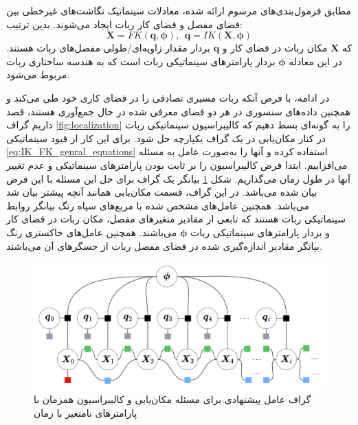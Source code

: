 مطابق فرمول‌بندی‌های مرسوم ارائه شده، معادلات سینماتیک نگاشت‌های غیرخطی بین فضای مفصل و فضای کار ربات ایجاد می‌شوند. بدین ترتیب:
\begin{equation} \label{eq:IK_FK_genral_equations}
	\boldsymbol{X} = FK(\boldsymbol{q}, \boldsymbol{\phi}), ~~ \boldsymbol{q} = IK(\boldsymbol{X}, \boldsymbol{\phi})
\end{equation}
که
$\boldsymbol{X}$
مکان ربات در فضای کار و
$\boldsymbol{q}$
بردار مقدار زاویه‌ای/طولی مفصل‌های ربات هستند. در این معادله
$\boldsymbol{\phi}$
بردار پارامترهای سینماتیکی ربات است که به هندسه ساختاری ربات مربوط می‌شود.

در ادامه، با فرض آنکه ربات مسیری تصادفی را در فضای کاری خود طی می‌کند و همچنین داده‌های سنسوری در هر دو فضای معرفی شده در حال جمع‌آوری هستند، قصد داریم گراف
\ref{fig:localization}
را به گونه‌ای بسط دهیم که کالیبراسیون سینماتیکی ربات در کنار مکان‌یابی در یک گراف یکپارچه حل شود. برای این کار از قیود سینماتیکی
\ref{eq:IK_FK_genral_equations}
استفاده کرده و آنها را به‌صورت عامل به مسئله می‌افزاییم. ابتدا فرض کالیبراسیون را بر ثابت بودن پارامترهای سینماتیکی و عدم تغییر آنها در طول زمان می‌گذاریم. شکل
\ref{fig:kinematiclocalizationbasic}
بیانگر یک گراف برای حل این مسئله با این فرض بیان شده می‌باشد. در این گراف، قسمت مکان‌یابی همانند آنچه پیشتر بیان شد می‌باشد. همچنین عامل‌های مشخص شده با مربع‌های سیاه رنگ بیانگر روابط سینماتیکی ربات هستند که تابعی از مقادیر متغیرهای مفصل، مکان ربات در فضای کار و بردار پارامترهای سینماتیکی ربات
 $\boldsymbol{\phi}$
 می‌باشند. همچنین عامل‌های خاکستری رنگ بیانگر مقادیر اندازه‌گیری شده در فضای مفصل ربات از حسگرهای آن می‌باشند. 
\begin{figure}
	\centering
	\includegraphics[width=0.8\linewidth]{img/Kinematic_localization_basic}
	\caption{گراف عامل پیشنهادی برای مسئله مکان‌یابی و کالیبراسیون همزمان با پارامتر‌های نامتغیر با زمان}
	\label{fig:kinematiclocalizationbasic}
\end{figure}

